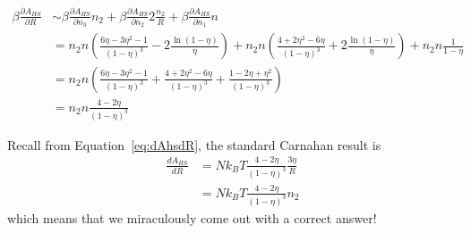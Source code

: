 \documentclass[letterpaper,twocolumn,amsmath,amssymb,prb]{revtex4-1}
\begin{document}
\begin{widetext}
\begin{align}
  \beta \frac{\partial A_{HS}}{\partial R} &\sim
    \beta \frac{\partial A_{HS}}{\partial n_3} n_2 +
    \beta \frac{\partial A_{HS}}{\partial n_2} 2 \frac{n_2}{R} +
    \beta \frac{\partial A_{HS}}{\partial n_1} n
  \\
  &=
    n_2n \left(
      \frac{6\eta - 3\eta^2 - 1}{(1-\eta)^3} -
      2\frac{\ln(1-\eta)}{\eta}
    \right) +
    n_2n \left( \frac{4+2\eta^2-6\eta}{(1-\eta)^3} + 2\frac{\ln(1-\eta)}{\eta} \right) +
    n_2n\frac{1}{1-\eta}
  \\
  &=
    n_2n \left(
      \frac{6\eta - 3\eta^2 - 1}{(1-\eta)^3} +
    \frac{4+2\eta^2-6\eta}{(1-\eta)^3} +
    \frac{1 - 2\eta + \eta^2}{(1-\eta)^3}
  \right)
  \\
  &=
    n_2n \frac{4 - 2\eta}{(1-\eta)^3}
\end{align}
\end{widetext}
Recall from Equation~\ref{eq:dAhsdR}, the standard Carnahan result is
\begin{align}
  \frac{dA_{HS}}{dR}
  &= Nk_BT \frac{4 - 2\eta}{(1-\eta)^3} \frac{3 \eta}{R}
  \\ &= Nk_BT \frac{4 - 2\eta}{(1-\eta)^3} n_2
\end{align}
which means that we miraculously come out with a correct answer!
\end{document}
